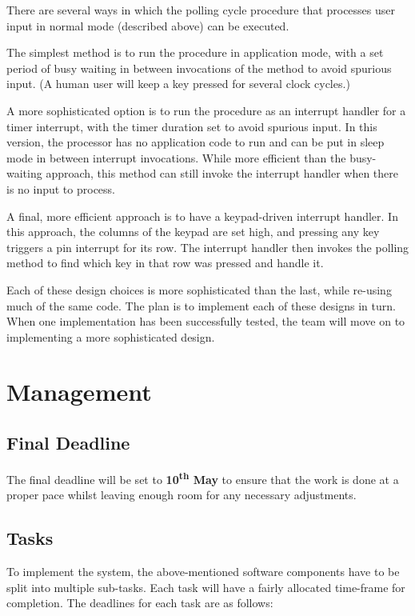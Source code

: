 \documentclass[11pt,a4paper,twocolumn]{scrartcl}
\begin{document}
There are several ways in which the polling cycle procedure that processes user input in normal mode (described above) can be executed.

The simplest method is to run the procedure in application mode, with a set period of busy waiting in between invocations of the method to avoid spurious input.
(A human user will keep a key pressed for several clock cycles.)

A more sophisticated option is to run the procedure as an interrupt handler for a timer interrupt, with the timer duration set to avoid spurious input. In this version, the processor has no application code to run and can be put in sleep mode in between interrupt invocations. While more efficient than the busy-waiting approach, this method can still invoke the interrupt handler when there is no input to process.

A final, more efficient approach is to have a keypad-driven interrupt handler. In this approach, the columns of the keypad are set high, and pressing any key
triggers a pin interrupt for its row. The interrupt handler then invokes the polling method to find which key in that row was pressed and handle it.

Each of these design choices is more sophisticated than the last, while re-using much of the same code. The plan is to implement each of these designs in turn. When one implementation has been successfully tested, the team will move on to implementing a more sophisticated design.

\section{Management} \label{schedule}
\subsection{Final Deadline}
The final deadline will be set to \textbf{10\textsuperscript{th} May} to ensure that the work is done at a proper pace whilst leaving enough room for any necessary 
adjustments.

\subsection{Tasks}
To implement the system, the above-mentioned software components have to be split into multiple sub-tasks. Each task will have a fairly allocated time-frame for completion. The deadlines for each task are as follows:
\end{document}
